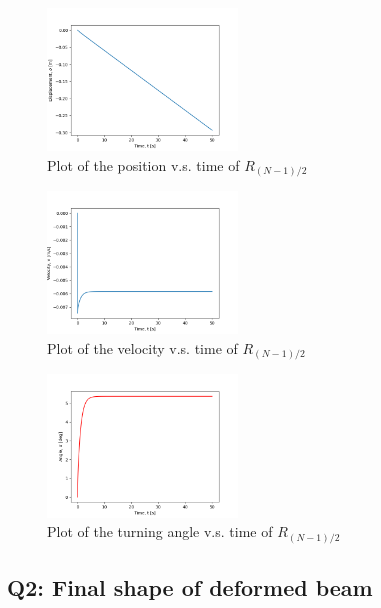 \documentclass[letterpaper, 10 pt, conference]{ieeeconf}  %
\begin{document}
\begin{figure}[!ht]
        \centering
        \includegraphics[width=0.45\textwidth,keepaspectratio]{p2q1_implicit_fallingBeam.png}
        \caption{Plot of the position v.s. time of $R_{(N-1)/2}$}
        \label{"fig:p2q1_position"}
\end{figure}

\begin{figure}[!ht]
        \centering
        \includegraphics[width=0.45\textwidth,keepaspectratio]{p2q1_implicit_fallingBeam_velocity.png}
        \caption{Plot of the velocity v.s. time of $R_{(N-1)/2}$}
        \label{"fig:p2q1_velocity"}
\end{figure}

\begin{figure}[!ht]
        \centering
        \includegraphics[width=0.45\textwidth,keepaspectratio]{p2q1_implicit_fallingBeam_angle.png}
        \caption{Plot of the turning angle v.s. time of $R_{(N-1)/2}$}
        \label{"fig:p2q1_angle"}
\end{figure}

\subsection*{Q2: Final shape of deformed beam}
\end{document}
